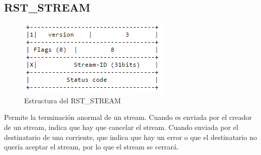 \subsection{RST\_STREAM}
\begin{figure}[H] %
\includegraphics[scale=1]{rststream.png}  %
\centering
\caption{Estructura del RST\_STREAM} \label{fig:figura5}
\end{figure}
Permite la terminación anormal de un stream. Cuando es enviada por el creador de un stream, indica que hay que cancelar el stream. Cuando enviada por el destinatario de una corriente, que indica que hay un error o que el destinatario no quería aceptar el stream, por lo que el stream se cerrará.
